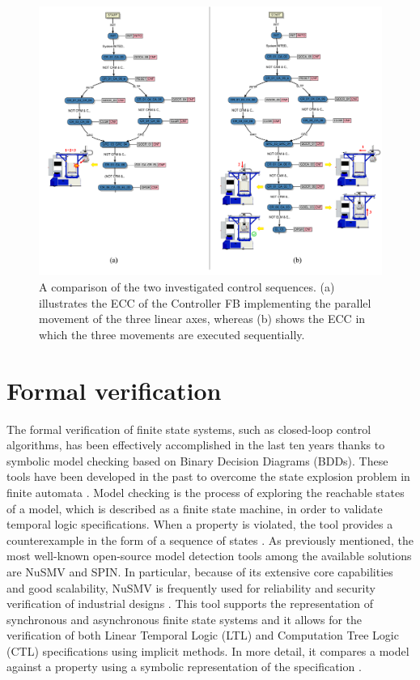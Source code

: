 \documentclass{ieeeojies}
\begin{document}
\begin{figure}
    \centering
    \includegraphics[width=\textwidth]{pictures/lilli09.eps}
    \caption{A comparison of the two investigated control sequences. (a) illustrates the ECC of the Controller FB implementing the parallel movement of the three linear axes, whereas (b) shows the ECC in which the three movements are executed sequentially.} 
    \label{fig:par_seq}
\end{figure}

\newpage

\section{Formal verification}
\label{sec:formal_verification}
The formal verification of finite state systems, such as \mbox{closed-loop} control algorithms, has been effectively accomplished in the last ten years thanks to symbolic model checking based on Binary Decision Diagrams (BDDs). These tools have been developed in the past to overcome the state explosion problem in finite automata \cite{burch1992}. 
Model checking is the process of exploring the reachable states of a model, which is described as a finite state machine, in order to validate temporal logic specifications.
When a property is violated, the tool provides a counterexample in the form of a sequence of states \cite{Biere2003}. As previously mentioned, the most well-known open-source model detection tools among the available solutions are NuSMV and SPIN. In particular, because of its extensive core capabilities and good scalability, NuSMV is frequently used for reliability and security verification of industrial designs \cite{xu2018}. This tool supports the representation of synchronous and asynchronous finite state systems and it allows for the verification of both Linear Temporal Logic (LTL) and Computation Tree Logic (CTL) specifications using implicit methods. In more detail, it compares a model against a property using a symbolic representation of the specification \cite{frappier2010}. 
\end{document}
